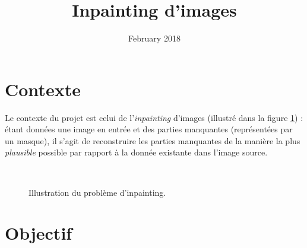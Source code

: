 \documentclass{article}
\title{Inpainting d'images}
\date{February 2018}
\begin{document}
\maketitle


\section*{Contexte}


Le contexte du projet est celui de l'\emph{inpainting} d'images  (illustré
dans la figure \ref{fig:my_label}) : étant données une image en entrée
et des parties manquantes (représentées par un masque), il s'agit de
reconstruire les parties manquantes de la manière la plus \emph{plausible}
possible par rapport à la donnée existante dans l'image source.

\begin{figure}[!h]
\centering
{}
\\
\caption{Illustration du problème d'inpainting.}
\label{fig:my_label}
\end{figure}
\section*{Objectif}
\end{document}
